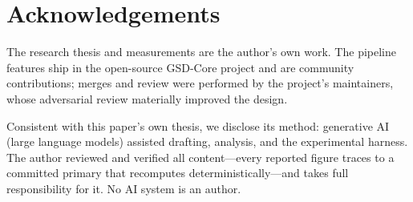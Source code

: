 \documentclass[11pt]{article}
\begin{document}
\section*{Acknowledgements}
The research thesis and measurements are the author's own work. The pipeline features ship in the
open-source GSD-Core project and are community contributions; merges and review were performed by the
project's maintainers, whose adversarial review materially improved the design.

Consistent with this paper's own thesis, we disclose its method: generative AI (large language models)
assisted drafting, analysis, and the experimental harness. The author reviewed and verified all
content---every reported figure traces to a committed primary that recomputes deterministically---and
takes full responsibility for it. No AI system is an author.



\end{document}

